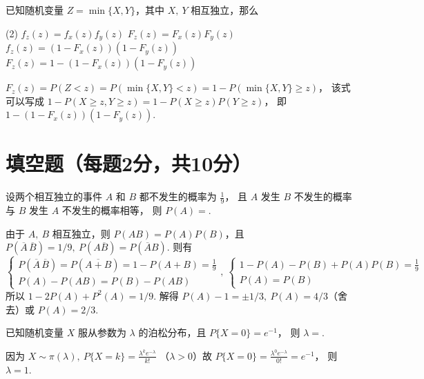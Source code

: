 \begin{problem}
  已知随机变量 $Z = \min\{X,Y\}$，其中 $X,~ Y$ 相互独立，那么
  \begin{tasks}(2)
    \task $f_z(z) = f_x(z) f_y(z)$
    \task $F_z(z) = F_x(z) F_y(z)$
    \task $f_z(z) = (1 - F_x(z)) (1 - F_y(z))$
    \task[\true] $F_z(z) = 1 - (1 - F_x(z)) (1 - F_y(z))$
  \end{tasks}
\end{problem}
\scratch[4ex]
\begin{solution}
  $F_z(z) = P(Z < z) = P(\min\{X,Y\} < z) = 1 - P(\min\{X,Y\} \geq z)$，
  该式可以写成 $1 - P(X \geq z, Y \geq z) = 1 - P(X \geq z)P(Y \geq z)$，
  即 $1 - (1 - F_x(z)) (1 - F_y(z))$.
\end{solution}

\section{填空题（每题2分，共10分）}

\begin{problem}
  设两个相互独立的事件 $A$ 和 $B$ 都不发生的概率为 $\frac19$，
  且 $A$ 发生 $B$ 不发生的概率与 $B$ 发生 $A$ 不发生的概率相等，
  则 $P(A) = $.
\end{problem}
\scratch[8ex]
\begin{solution}
  由于 $A,~ B$ 相互独立，则 $P(AB) = P(A) P(B)$，且
  $P(\overline A\,\overline B) = 1/9,~ P(A \overline B) = P(\overline AB)$. 则有
  \[
    \begin{cases}
      P(\overline A\,\overline B) = P(\overline{A + B})
                                  = 1 - P(A + B) = \frac19\\
      P(A) - P(AB) = P(B) - P(AB)
    \end{cases},~
    \begin{cases}
      1 - P(A) - P(B) + P(A) P(B) = \frac19\\
      P(A) = P(B)
    \end{cases}
  \]
  所以 $1 - 2P(A) + P^2(A) = 1/9$.
  解得 $P(A) - 1 = \pm 1/3,~ P(A) = 4/3$（舍去）或 $P(A) = 2/3$.
\end{solution}

\begin{problem}
  已知随机变量 $X$ 服从参数为 $\lambda$ 的泊松分布，且 $P\{X = 0\} = e^{-1}$，
  则 $\lambda = $.
\end{problem}
\scratch[4ex]
\begin{solution}
  因为 $X \sim \pi(\lambda),~ P\{X = k\} = \frac{\lambda^k e^{-\lambda}}{k!}$
  （$\lambda > 0$）故 $P\{X = 0\} = \frac{\lambda^0 e^{-\lambda}}{0!} = e^{-1}$，
  则 $\lambda = 1$.
\end{solution}


